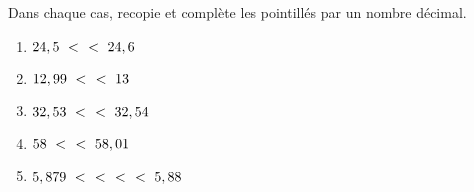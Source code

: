 \begin{exercice}
Dans chaque cas, recopie et complète les pointillés par un nombre décimal.
\begin{enumerate} 
 \item $24,5 < \dotfill < 24,6$ \hspace*{13em} 
 
 \item $12,99 < \dotfill < 13$ \hspace*{13.5em}
 
 \item $32,53 < \dotfill < 32,54$ \hspace*{12em}
 
 \item $58 < \dotfill < 58,01$ \hspace*{13.5em}
 
 \item $5,879 < \dotfill < \dotfill < \dotfill < 5,88$ \hspace*{5em}

 \end{enumerate}
\end{exercice}




